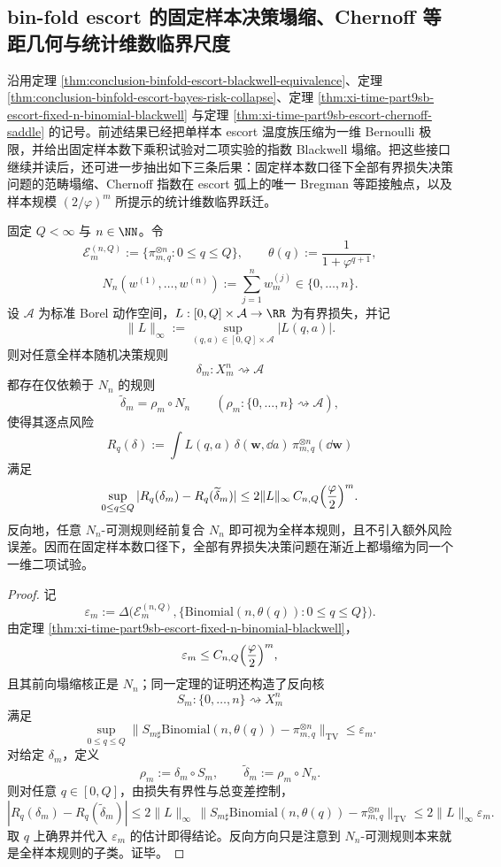 \subsection{bin-fold escort 的固定样本决策塌缩、Chernoff 等距几何与统计维数临界尺度}\label{subsec:conclusion-binfold-fixedn-chernoff-statdim}
沿用定理 \ref{thm:conclusion-binfold-escort-blackwell-equivalence}、定理 \ref{thm:conclusion-binfold-escort-bayes-risk-collapse}、定理 \ref{thm:xi-time-part9sb-escort-fixed-n-binomial-blackwell} 与定理 \ref{thm:xi-time-part9sb-escort-chernoff-saddle} 的记号。前述结果已经把单样本 escort 温度族压缩为一维 Bernoulli 极限，并给出固定样本数下乘积试验对二项实验的指数 Blackwell 塌缩。把这些接口继续并读后，还可进一步抽出如下三条后果：固定样本数口径下全部有界损失决策问题的范畴塌缩、Chernoff 指数在 escort 弧上的唯一 Bregman 等距接触点，以及样本规模 \((2/\varphi)^m\) 所提示的统计维数临界跃迁。

\begin{theorem}[固定样本数下的有界损失决策完备塌缩]\label{thm:conclusion-binfold-escort-fixed-n-bounded-loss-decision-collapse}
固定 \(Q<\infty\) 与 \(n\in\NN\)。令
\[
\mathcal E_m^{(n,Q)}:=\{\pi_{m,q}^{\otimes n}:0\le q\le Q\},
\qquad
\theta(q):=\frac{1}{1+\varphi^{q+1}},
\]
\[
N_n(w^{(1)},\dots,w^{(n)}):=\sum_{j=1}^n w_m^{(j)}\in\{0,\dots,n\}.
\]
设 \(\mathcal A\) 为标准 Borel 动作空间，\(L:[0,Q]\times\mathcal A\to\RR\) 为有界损失，并记
\[
\|L\|_\infty:=\sup_{(q,a)\in[0,Q]\times\mathcal A}|L(q,a)|.
\]
则对任意全样本随机决策规则
\[
\delta_m:X_m^n\rightsquigarrow \mathcal A
\]
都存在仅依赖于 \(N_n\) 的规则
\[
\widetilde\delta_m=\rho_m\circ N_n
\qquad
(\rho_m:\{0,\dots,n\}\rightsquigarrow \mathcal A),
\]
使得其逐点风险
\[
R_q(\delta):=\int L(q,a)\,\delta(\mathbf w,\dd a)\,\pi_{m,q}^{\otimes n}(\dd\mathbf w)
\]
满足
\[
\sup_{0\le q\le Q}|R_q(\delta_m)-R_q(\widetilde\delta_m)|
\le
2\|L\|_\infty\,C_{n,Q}\Bigl(\frac{\varphi}{2}\Bigr)^m.
\]
反向地，任意 \(N_n\)-可测规则经前复合 \(N_n\) 即可视为全样本规则，且不引入额外风险误差。因而在固定样本数口径下，全部有界损失决策问题在渐近上都塌缩为同一个一维二项试验。
\end{theorem}
\begin{proof}
记
\[
\varepsilon_m:=\Delta\bigl(\mathcal E_m^{(n,Q)},\{\mathrm{Binomial}(n,\theta(q)):0\le q\le Q\}\bigr).
\]
由定理 \ref{thm:xi-time-part9sb-escort-fixed-n-binomial-blackwell}，
\[
\varepsilon_m\le C_{n,Q}\Bigl(\frac{\varphi}{2}\Bigr)^m,
\]
且其前向塌缩核正是 \(N_n\)；同一定理的证明还构造了反向核
\[
S_m:\{0,\dots,n\}\rightsquigarrow X_m^n
\]
满足
\[
\sup_{0\le q\le Q}
\|S_{m\sharp}\mathrm{Binomial}(n,\theta(q))-\pi_{m,q}^{\otimes n}\|_{\mathrm{TV}}
\le \varepsilon_m.
\]
对给定 \(\delta_m\)，定义
\[
\rho_m:=\delta_m\circ S_m,
\qquad
\widetilde\delta_m:=\rho_m\circ N_n.
\]
则对任意 \(q\in[0,Q]\)，由损失有界性与总变差控制，
\[
|R_q(\delta_m)-R_q(\widetilde\delta_m)|
\le
2\|L\|_\infty\,
\|S_{m\sharp}\mathrm{Binomial}(n,\theta(q))-\pi_{m,q}^{\otimes n}\|_{\mathrm{TV}}
\le
2\|L\|_\infty\varepsilon_m.
\]
取 \(q\) 上确界并代入 \(\varepsilon_m\) 的估计即得结论。反向方向只是注意到 \(N_n\)-可测规则本来就是全样本规则的子类。证毕。
\end{proof}

